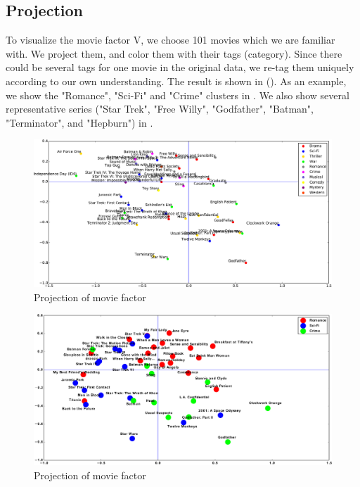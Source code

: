 \documentclass[12pt]{article}
\begin{document}
\subsection{Projection}
To visualize the movie factor V, we choose 101 movies which we are familiar with. We project them, and color them with their tags (category). Since there could be several tags for one movie in the original data, we re-tag them uniquely according to our own understanding. The result is shown in (). As an example, we show the "Romance", "Sci-Fi" and "Crime" clusters in . We also show several representative series ("Star Trek", "Free Willy", "Godfather", "Batman", "Terminator", and "Hepburn") in .


\begin{figure}[h!]
  \centering
      \includegraphics[width=\textwidth]{1_All_Movies_Seen-crop.pdf}
  \caption{Projection of movie factor}
  \label{fig:all}
\end{figure}

\begin{figure}[h!]
  \centering
      \includegraphics[width=\textwidth]{2_Three_Clusters_with_Name_adjust-crop.pdf}
  \caption{Projection of movie factor}
  \label{fig:cluster}
\end{figure}
\end{document}
